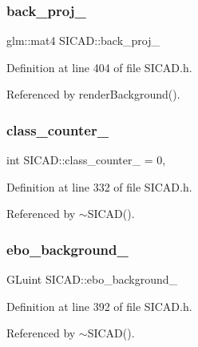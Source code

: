 \subsubsection{\texorpdfstring{back\+\_\+proj\+\_\+}{back\_proj\_}}
{\footnotesize\ttfamily glm\+::mat4 S\+I\+C\+A\+D\+::back\+\_\+proj\+\_\+\hspace{0.3cm}{\ttfamily [private]}}



Definition at line 404 of file S\+I\+C\+A\+D.\+h.



Referenced by render\+Background().

\mbox{\label{classSICAD_a16f7c3c77ddea5ba57bbcbcdd7a8d125}} 
\subsubsection{\texorpdfstring{class\+\_\+counter\+\_\+}{class\_counter\_}}
{\footnotesize\ttfamily int S\+I\+C\+A\+D\+::class\+\_\+counter\+\_\+ = 0\hspace{0.3cm}{\ttfamily [static]}, {\ttfamily [private]}}



Definition at line 332 of file S\+I\+C\+A\+D.\+h.



Referenced by $\sim$\+S\+I\+C\+A\+D().

\mbox{\label{classSICAD_a2cdcd11dd55a4b02b85d7c32435cc719}} 
\subsubsection{\texorpdfstring{ebo\+\_\+background\+\_\+}{ebo\_background\_}}
{\footnotesize\ttfamily G\+Luint S\+I\+C\+A\+D\+::ebo\+\_\+background\+\_\+\hspace{0.3cm}{\ttfamily [private]}}



Definition at line 392 of file S\+I\+C\+A\+D.\+h.



Referenced by $\sim$\+S\+I\+C\+A\+D().

